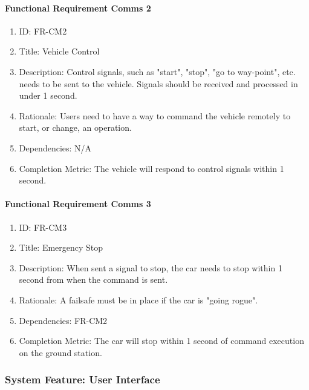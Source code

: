 \documentclass[compsoc,draftclsnofoot,onecolumn,10pt]{IEEEtran}
\begin{document}
	\paragraph{Functional Requirement Comms 2}
		\begin{enumerate}
			\item ID: FR-CM2
			\item Title: Vehicle Control
			\item Description: Control signals, such as "start", "stop", "go to way-point", etc. needs to be sent to the vehicle. Signals should be received and processed in under 1 second.
			\item Rationale: Users need to have a way to command the vehicle remotely to start, or change, an operation.
			\item Dependencies: N/A
			\item Completion Metric: The vehicle will respond to control signals within 1 second.
		\end{enumerate}
		
        \paragraph{Functional Requirement Comms 3}
			\begin{enumerate}
				\item ID: FR-CM3
				\item Title: Emergency Stop
				\item Description: When sent a signal to stop, the car needs to stop within 1 second from when the command is sent.
				\item Rationale: A failsafe must be in place if the car is "going rogue".
				\item Dependencies: FR-CM2
				\item Completion Metric: The car will stop within 1 second of command execution on the ground station.
			\end{enumerate}

\subsubsection{System Feature: User Interface}
\end{document}
